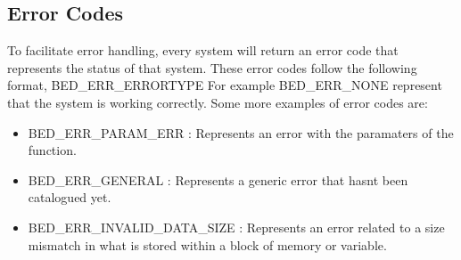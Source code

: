 \documentclass{article}
\begin{document}
\subsection{Error Codes}
To facilitate error handling, every system will return an error code that represents the status of that system. These error codes follow the following format, BED\_ERR\_ERRORTYPE
For example BED\_ERR\_NONE represent that the system is working correctly. Some more examples of error codes are:
\begin{itemize}
	\item BED\_ERR\_PARAM\_ERR		 	: Represents an error with the paramaters of the function.
	\item BED\_ERR\_GENERAL			 	: Represents a generic error that hasnt been catalogued yet.
	\item BED\_ERR\_INVALID\_DATA\_SIZE	: Represents an error related to a size mismatch in what is stored within a block of memory or variable.
\end{itemize}
































\end{document}
